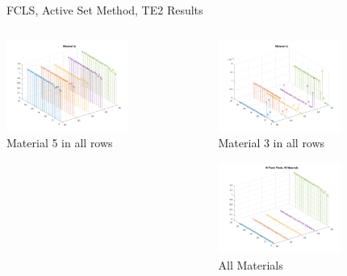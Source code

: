 \documentclass{beamer}
\begin{document}
\begin{frame}{FCLS, Active Set Method, TE2 Results}
\begin{columns}
\begin{column}{0.33\textwidth}
        \includegraphics[width=4cm,center]{fcls_te2_material_stem_5}
        \\ Material 5 in all rows
        \centering
    \end{column}
    \begin{column}{0.33\textwidth}
        \includegraphics[width=4cm,center]{fcls_te2_material_stem_3}
        \\ Material 3 in all rows
        \centering

        \includegraphics[width=4cm,center]{fcls_te2_allmaterials}
        \\ All Materials
        \centering
    \end{column}
\end{columns}
\end{frame}
\end{document}
